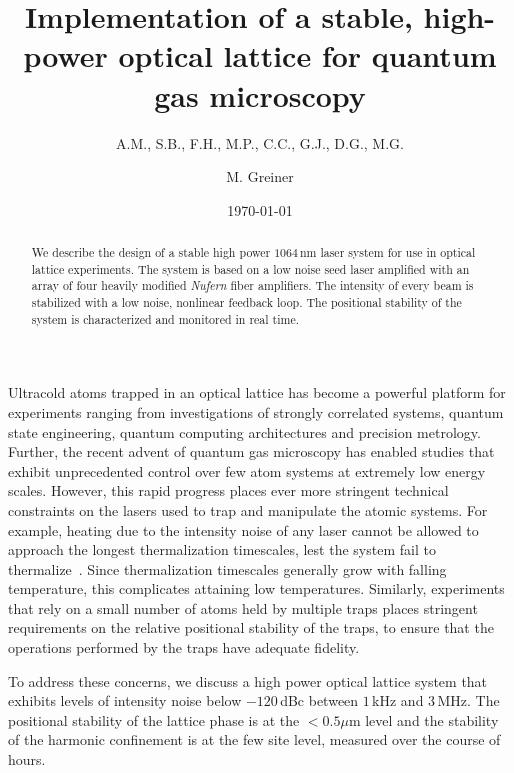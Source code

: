 \documentclass[twocolumn,aps,pra,showpacs,preprintnumbers,bibnotes]{revtex4-1}
\begin{document}
\title{Implementation of a stable, high-power optical lattice for quantum gas microscopy}


\author{A.M., S.B., F.H., M.P., C.C., G.J., D.G., M.G.}
\author{M. Greiner}

\date{\today}
\begin{abstract}
We describe the design of a stable high power $1064\,$nm laser system for use in optical lattice experiments. The system is based on a low noise seed laser amplified with an array of four heavily modified \textit{Nufern} fiber amplifiers. The intensity of every beam is stabilized with a low noise, nonlinear feedback loop. The positional stability of the system is characterized and monitored in real time.  
\end{abstract}
\maketitle

Ultracold atoms trapped in an optical lattice has become a powerful platform for experiments ranging from investigations of strongly correlated systems, quantum state engineering, quantum computing architectures and precision metrology\cite{Ye}.
Further, the recent advent of quantum gas microscopy has enabled studies that exhibit unprecedented control over few atom systems at extremely low energy scales.
However, this rapid progress places ever more stringent technical constraints on the lasers used to trap and manipulate the atomic systems.
For example, heating due to the intensity noise of any laser cannot be allowed to approach the longest thermalization timescales, lest the system fail to thermalize~\cite{Savard1997}. 
Since thermalization timescales generally grow with falling temperature, this complicates attaining low temperatures.
Similarly, experiments that rely on a small number of atoms held by multiple traps places stringent requirements on the relative positional stability of the traps, to ensure that the operations performed by the traps have adequate fidelity.

To address these concerns, we discuss a high power optical lattice system that exhibits levels of intensity noise below $-120\,$dBc between $1\,$kHz and $3\,$MHz.
The positional stability of the lattice phase is at the $<0.5\mu$m level and the stability of the harmonic confinement is at the few site level, measured over the course of hours.
\end{document}
